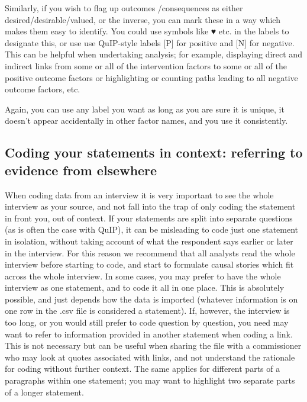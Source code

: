 \documentclass[
]{book}
\begin{document}
Similarly, if you wish to flag up outcomes /consequences as either desired/desirable/valued, or the inverse, you can mark these in a way which makes them easy to identify. You could use symbols like ♥ etc. in the labels to designate this, or use use QuIP-style labels {[}P{]} for positive and {[}N{]} for negative. This can be helpful when undertaking analysis; for example, displaying direct and indirect links from some or all of the intervention factors to some or all of the positive outcome factors or highlighting or counting paths leading to all negative outcome factors, etc.

Again, you can use any label you want as long as you are sure it is unique, it doesn't appear accidentally in other factor names, and you use it consistently.

\hypertarget{coding-your-statements-in-context-referring-to-evidence-from-elsewhere}{%
\subsection{Coding your statements in context: referring to evidence from elsewhere}\label{coding-your-statements-in-context-referring-to-evidence-from-elsewhere}}

When coding data from an interview it is very important to see the whole interview as your source, and not fall into the trap of only coding the statement in front you, out of context. If your statements are split into separate questions (as is often the case with QuIP), it can be misleading to code just one statement in isolation, without taking account of what the respondent says earlier or later in the interview. For this reason we recommend that all analysts read the whole interview before starting to code, and start to formulate causal stories which fit across the whole interview. In some cases, you may prefer to have the whole interview as one statement, and to code it all in one place. This is absolutely possible, and just depends how the data is imported (whatever information is on one row in the .csv file is considered a statement). If, however, the interview is too long, or you would still prefer to code question by question, you need may want to refer to information provided in another statement when coding a link. This is not necessary but can be useful when sharing the file with a commissioner who may look at quotes associated with links, and not understand the rationale for coding without further context. The same applies for different parts of a paragraphs within one statement; you may want to highlight two separate parts of a longer statement.
\end{document}
